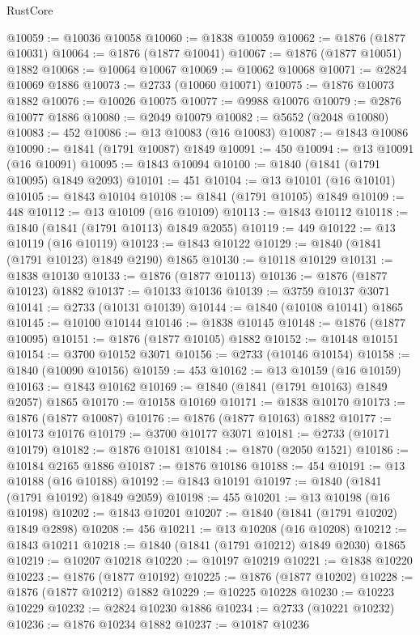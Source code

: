 \begin{lexlean}{RustCore}
\begin{coremodule}
@10059 := @10036 @10058
@10060 := @1838 @10059
@10062 := @1876 (@1877 @10031)
@10064 := @1876 (@1877 @10041)
@10067 := @1876 (@1877 @10051) @1882
@10068 := @10064 @10067
@10069 := @10062 @10068
@10071 := @2824 @10069 @1886
@10073 := @2733 (@10060 @10071)
@10075 := @1876 @10073 @1882
@10076 := @10026 @10075
@10077 := @9988 @10076
@10079 := @2876 @10077 @1886
@10080 := @2049 @10079
@10082 := @5652 (@2048 @10080)
@10083 := 452
@10086 := @13 @10083 (@16 @10083)
@10087 := @1843 @10086
@10090 := @1841 (@1791 @10087) @1849
@10091 := 450
@10094 := @13 @10091 (@16 @10091)
@10095 := @1843 @10094
@10100 := @1840 (@1841 (@1791 @10095) @1849 @2093)
@10101 := 451
@10104 := @13 @10101 (@16 @10101)
@10105 := @1843 @10104
@10108 := @1841 (@1791 @10105) @1849
@10109 := 448
@10112 := @13 @10109 (@16 @10109)
@10113 := @1843 @10112
@10118 := @1840 (@1841 (@1791 @10113) @1849 @2055)
@10119 := 449
@10122 := @13 @10119 (@16 @10119)
@10123 := @1843 @10122
@10129 := @1840 (@1841 (@1791 @10123) @1849 @2190) @1865
@10130 := @10118 @10129
@10131 := @1838 @10130
@10133 := @1876 (@1877 @10113)
@10136 := @1876 (@1877 @10123) @1882
@10137 := @10133 @10136
@10139 := @3759 @10137 @3071
@10141 := @2733 (@10131 @10139)
@10144 := @1840 (@10108 @10141) @1865
@10145 := @10100 @10144
@10146 := @1838 @10145
@10148 := @1876 (@1877 @10095)
@10151 := @1876 (@1877 @10105) @1882
@10152 := @10148 @10151
@10154 := @3700 @10152 @3071
@10156 := @2733 (@10146 @10154)
@10158 := @1840 (@10090 @10156)
@10159 := 453
@10162 := @13 @10159 (@16 @10159)
@10163 := @1843 @10162
@10169 := @1840 (@1841 (@1791 @10163) @1849 @2057) @1865
@10170 := @10158 @10169
@10171 := @1838 @10170
@10173 := @1876 (@1877 @10087)
@10176 := @1876 (@1877 @10163) @1882
@10177 := @10173 @10176
@10179 := @3700 @10177 @3071
@10181 := @2733 (@10171 @10179)
@10182 := @1876 @10181
@10184 := @1870 (@2050 @1521)
@10186 := @10184 @2165 @1886
@10187 := @1876 @10186
@10188 := 454
@10191 := @13 @10188 (@16 @10188)
@10192 := @1843 @10191
@10197 := @1840 (@1841 (@1791 @10192) @1849 @2059)
@10198 := 455
@10201 := @13 @10198 (@16 @10198)
@10202 := @1843 @10201
@10207 := @1840 (@1841 (@1791 @10202) @1849 @2898)
@10208 := 456
@10211 := @13 @10208 (@16 @10208)
@10212 := @1843 @10211
@10218 := @1840 (@1841 (@1791 @10212) @1849 @2030) @1865
@10219 := @10207 @10218
@10220 := @10197 @10219
@10221 := @1838 @10220
@10223 := @1876 (@1877 @10192)
@10225 := @1876 (@1877 @10202)
@10228 := @1876 (@1877 @10212) @1882
@10229 := @10225 @10228
@10230 := @10223 @10229
@10232 := @2824 @10230 @1886
@10234 := @2733 (@10221 @10232)
@10236 := @1876 @10234 @1882
@10237 := @10187 @10236

\end{coremodule}
\end{lexlean}
